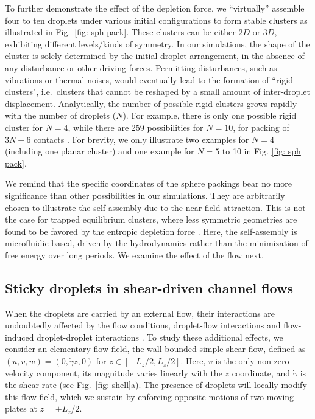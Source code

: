 To further demonstrate the effect of the depletion force, we ``virtually'' assemble four to ten droplets under various initial configurations to form stable clusters as illustrated in Fig.\ \ref{fig: sph pack}. These clusters can be either $2D$ or $3D$, exhibiting different levels/kinds of symmetry. In our simulations, the shape of the cluster is solely determined by the initial droplet arrangement, in the absence of any disturbance or other driving forces. Permitting disturbances, such as vibrations or thermal noises, would eventually lead to the formation of ``rigid clusters", i.e.\ clusters that cannot be reshaped by a small amount of inter-droplet displacement. Analytically, the number of possible rigid clusters grows rapidly with the number of droplets ($N$). For example, there is only one possible rigid cluster for $N = 4$, while there are 259 possibilities for $N = 10$, for packing of $3N-6$ contacts  \citep{Holmes-Cerfon}. For brevity, we only illustrate two examples for $N = 4$ (including one planar cluster) and one example for $N = 5$ to 10 in Fig. \ref{fig: sph pack}. 

We remind that the specific coordinates of the sphere packings bear no more significance than other possibilities in our simulations. They are arbitrarily chosen to illustrate the self-assembly due to the near field attraction. This is not the case for trapped equilibrium clusters, where less symmetric geometries are found to be favored by the entropic depletion force \citep{Meng2010,Klein2018}.  Here, the self-assembly is microfluidic-based, driven by the hydrodynamics rather than the minimization of free energy over long periods. We examine the effect of the flow next.

\subsection{Sticky droplets in shear-driven channel flows} \label{sec:shear}

When the droplets are carried by an external flow, their interactions are undoubtedly affected by the flow conditions, droplet-flow interactions and flow-induced droplet-droplet interactions \citep{Fouxon_2017}. To study these additional effects, we consider an elementary flow field, the wall-bounded simple shear flow, defined as $(u,v,w)=(0, \dot{\gamma}z,0)$ for $z \in [-L_z/2,L_z/2]$. Here, $v$ is the only non-zero velocity component, its magnitude varies linearly with the $z$ coordinate, and $\dot{\gamma}$ is the shear rate (see Fig.\  \ref{fig: shell}a). The presence of droplets will locally modify this flow field, which we sustain by enforcing opposite motions of two moving plates at $z= \pm L_z/2$.

